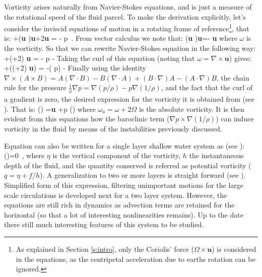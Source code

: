 Vorticity arises naturally from Navier-Stokes equations, and is just
a measure of the rotational speed of the fluid parcel. To make the
derivation explicitly, let's consider the inviscid equations of motion in
a rotating frame of reference\footnote{
    As explained in Section
    \ref{s:intro}, only the Coriolis' force ($\Omega \times \textbf{u}$) is
    considered in the equations, as the centripetal acceleration due to
    earths rotation can be ignored.
}, that is:
\beq
{}+(\textbf{u} \cdot \nabla)\textbf{u}+2\Omega \times \textbf{u}
= - \nabla p
\,.
From vector calculus we note that:
\beq
(\textbf{u} \cdot \nabla)\textbf{u}=- \textbf{u} \times \omega
{}
where $\omega$ is the vorticity. So that we can rewrite Navier-Stokes equation in the following way:
\beq
{}+(\omega+2\Omega) \times \textbf{u} = - \nabla p -
Taking the curl of this equation (noting that $\omega = \nabla \times
\textbf{u}$) gives:
\beq
{}+\nabla \times ((\omega+2\Omega) \times \textbf{u}) = -\nabla \times\left( \nabla p\right) -\nabla \times {}
Finally using the identity $\nabla \times (A \times B) = A (\nabla
\cdot B)-B (\nabla \cdot A)+(B \cdot \nabla)A-(A \cdot \nabla)B$, the
chain rule for the pressure $\frac{1}{\rho} \nabla p = \nabla (p/\rho)-p
\nabla (1/\rho)$, and the fact that the curl of a gradient is zero, the
desired expression for the vorticity it is obtained from
 (see ). That is:
\beq
{}\left(\right)
= \textbf{u}
  +\nabla p \times \nabla \left(\right)
where $\omega_a=\omega+2\Omega$ is the absolute vorticity. It is then
evident from this equations how the baroclinic term ($\nabla p \times
\nabla (1/\rho)$) can induce vorticity in the fluid by means of the
instabilities previously discussed.

Equation  can also be written for a single layer shallow water system as (see ):
\beq
{}\left(\right)=0
\,,
where $\eta$ is the vertical component of the vorticity, $h$ the instantaneous depth of the fluid, and the quantity conserved is referred as potential vorticity ($q=\eta + f/h$). A generalization to two or  more layers is straight forward (see ).  Simplified form of this
expression, filtering unimportant motions for the large scale circulations
is developed next for a two layer system. However, the equations are
still rich in dynamics as advection terms are retained for the horizontal
(so that a lot of interesting nonlinearities remains). Up to the date
there still much interesting features of this system to be studied.




